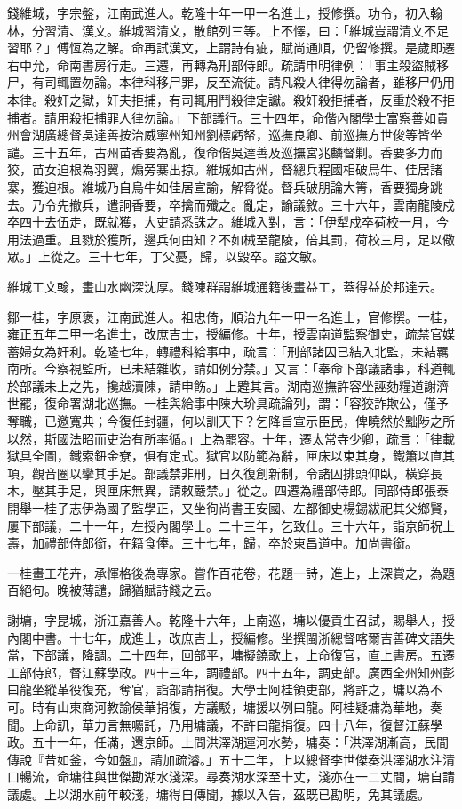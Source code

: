 \begin{pinyinscope}
錢維城，字宗盤，江南武進人。乾隆十年一甲一名進士，授修撰。功令，初入翰林，分習清、漢文。維城習清文，散館列三等。上不懌，曰：「維城豈謂清文不足習耶？」傅恆為之解。命再試漢文，上謂詩有疵，賦尚通順，仍留修撰。是歲即遷右中允，命南書房行走。三遷，再轉為刑部侍郎。疏請申明律例：「事主殺盜賊移尸，有司輒置勿論。本律科移尸罪，反至流徒。請凡殺人律得勿論者，雖移尸仍用本律。殺奸之獄，奸夫拒捕，有司輒用鬥殺律定讞。殺奸殺拒捕者，反重於殺不拒捕者。請用殺拒捕罪人律勿論。」下部議行。三十四年，命偕內閣學士富察善如貴州會湖廣總督吳達善按治威寧州知州劉標虧帑，巡撫良卿、前巡撫方世俊等皆坐譴。三十五年，古州苗香要為亂，復命偕吳達善及巡撫宮兆麟督剿。香要多力而狡，苗女迫根為羽翼，煽旁寨出掠。維城如古州，督總兵程國相破烏牛、佳居諸寨，獲迫根。維城乃自烏牛如佳居宣諭，解脅從。督兵破朋論大箐，香要獨身跳去。乃令先撤兵，遣詗香要，卒擒而殲之。亂定，諭議敘。三十六年，雲南龍陵戍卒四十去伍走，既就獲，大吏請悉誅之。維城入對，言：「伊犁戍卒荷校一月，今用法過重。且戮於獲所，邊兵何由知？不如械至龍陵，倍其罰，荷校三月，足以儆眾。」上從之。三十七年，丁父憂，歸，以毀卒。謚文敏。

維城工文翰，畫山水幽深沈厚。錢陳群謂維城通籍後畫益工，蓋得益於邦達云。

鄒一桂，字原褒，江南武進人。祖忠倚，順治九年一甲一名進士，官修撰。一桂，雍正五年二甲一名進士，改庶吉士，授編修。十年，授雲南道監察御史，疏禁官媒蓄婦女為奸利。乾隆七年，轉禮科給事中，疏言：「刑部諸囚已結入北監，未結羈南所。今察視監所，已未結雜收，請如例分禁。」又言：「奉命下部議諸事，科道輒於部議未上之先，攙越瀆陳，請申飭。」上韙其言。湖南巡撫許容坐誣劾糧道謝濟世罷，復命署湖北巡撫。一桂與給事中陳大玠具疏論列，謂：「容狡詐欺公，僅予奪職，已邀寬典；今復任封疆，何以訓天下？乞降旨宣示臣民，俾曉然於黜陟之所以然，斯國法昭而吏治有所率循。」上為罷容。十年，遷太常寺少卿，疏言：「律載獄具全圖，鐵索鈕金尞，俱有定式。獄官以防範為辭，匣床以束其身，鐵簫以直其項，觀音圈以攣其手足。部議禁非刑，日久復創新制，令諸囚排頭仰臥，橫穿長木，壓其手足，與匣床無異，請敕嚴禁。」從之。四遷為禮部侍郎。同部侍郎張泰開舉一桂子志伊為國子監學正，又坐徇尚書王安國、左都御史楊錫紱祀其父鄉賢，屢下部議，二十一年，左授內閣學士。二十三年，乞致仕。三十六年，詣京師祝上壽，加禮部侍郎銜，在籍食俸。三十七年，歸，卒於東昌道中。加尚書銜。

一桂畫工花卉，承惲格後為專家。嘗作百花卷，花題一詩，進上，上深賞之，為題百絕句。晚被薄譴，歸猶賦詩餞之云。

謝墉，字昆城，浙江嘉善人。乾隆十六年，上南巡，墉以優貢生召試，賜舉人，授內閣中書。十七年，成進士，改庶吉士，授編修。坐撰閩浙總督喀爾吉善碑文語失當，下部議，降調。二十四年，回部平，墉擬鐃歌上，上命復官，直上書房。五遷工部侍郎，督江蘇學政。四十三年，調禮部。四十五年，調吏部。廣西全州知州彭曰龍坐縱革役復充，奪官，詣部請捐復。大學士阿桂領吏部，將許之，墉以為不可。時有山東商河教諭侯華捐復，方議駁，墉援以例曰龍。阿桂疑墉為華地，奏聞。上命訊，華力言無囑託，乃用墉議，不許曰龍捐復。四十八年，復督江蘇學政。五十一年，任滿，還京師。上問洪澤湖運河水勢，墉奏：「洪澤湖漸高，民間傳說『昔如釜，今如盤』，請加疏濬。」五十二年，上以總督李世傑奏洪澤湖水注清口暢流，命墉往與世傑勘湖水淺深。尋奏湖水深至十丈，淺亦在一二丈間，墉自請議處。上以湖水前年較淺，墉得自傳聞，據以入告，茲既已勘明，免其議處。


\end{pinyinscope}
